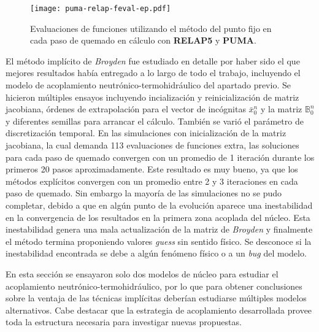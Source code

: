\begin{figure}[h!]
  \centering
  \texttt{[image: puma-relap-feval-ep.pdf]}  
  \caption[Evaluaciones de funciones utilizando el método del punto fijo en cada paso de quemado en cálculo con \textbf{RELAP5} y \textbf{Fermi}]
  {Evaluaciones de funciones utilizando el método del punto fijo en cada paso de quemado en cálculo con \textbf{RELAP5} y \textbf{PUMA}.}
  \label{fig-relap-puma-ep}
\end{figure}

El método implícito de \textit{Broyden} fue estudiado en detalle por haber sido el que mejores resultados había entregado a lo largo de todo el trabajo,
incluyendo el modelo de acoplamiento neutrónico-termohidráulico del apartado previo.
Se hicieron múltiples ensayos incluyendo incialización y reinicialización de matriz jacobiana,
órdenes de extrapolación para el vector de incógnitas $\bar{x}_0^n$ y la matriz $\mathbb{B}_{0}^n$ y
diferentes semillas para arrancar el cálculo.
También se varió el parámetro de discretización temporal.
En las simulaciones con inicialización de la matriz jacobiana, la cual demanda 113 evaluaciones de funciones extra,
las soluciones para cada paso de quemado convergen con un promedio de 1 iteración durante los primeros 20 pasos aproximadamente.
Este resultado es muy bueno, ya que los métodos explícitos convergen con un promedio entre 2 y 3 iteraciones en cada paso de quemado.
Sin embargo la mayoría de las simulaciones no se pudo completar,
debido a que en algún punto de la evolución aparece una inestabilidad en la convergencia de los resultados en la primera zona acoplada del núcleo.
Esta inestabilidad genera una mala actualización de la matriz de \textit{Broyden} y finalmente el método termina proponiendo valores \textit{guess} sin sentido físico.
Se desconoce si la inestabilidad encontrada se debe a algún fenómeno físico o a un \textit{bug} del modelo.

En esta sección se ensayaron solo dos modelos de núcleo para estudiar el acoplamiento neutrónico-termohidráulico,
por lo que para obtener conclusiones sobre la ventaja de las técnicas implícitas deberían estudiarse múltiples modelos alternativos.
Cabe destacar que la estrategia de acoplamiento desarrollada provee toda la estructura necesaria para investigar nuevas propuestas.
